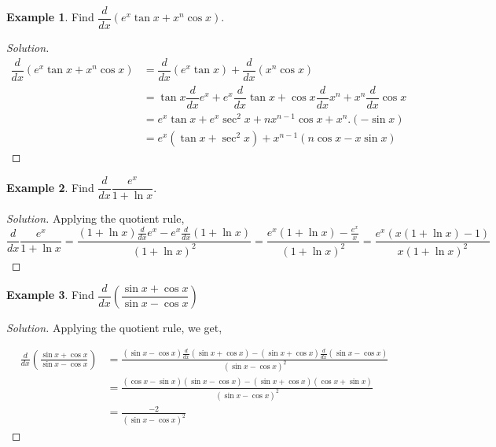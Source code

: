\documentclass[../../main.tex]{subfiles}
\theoremstyle{definition}
\newtheorem{example}{Example}[section]
\newenvironment{solution}
    {\begin{proof}[Solution]}
    {\end{proof}}
\begin{document}
\begin{example}
Find $\dfrac{d}{dx} (e^x \tan x +x^n \cos x)$.    
\end{example}

\begin{solution}
\begin{align*}
\dfrac{d}{dx} (e^x \tan x +x^n \cos x) &= \dfrac{d}{dx} (e^x \tan x) +\dfrac{d}{dx}(x^n \cos x) \\
&= \tan x\dfrac{d}{dx} e^x+e^x \dfrac{d}{dx}\tan x +\cos x\dfrac{d}{dx}x^n+x^n \dfrac{d}{dx}\cos x \\ 
&= e^x \tan x+e^x \sec^2 x +nx^{n-1}\cos x+x^n.(-\sin x) \\
&= e^x(\tan x+\sec^2 x)+x^{n-1}(n\cos x-x\sin x)
\end{align*}    
\end{solution}

\begin{example}
Find $\dfrac{d}{dx} \dfrac{e^x}{1+\ln x}$.    
\end{example}

\begin{solution}
Applying the quotient rule, 
\[
\dfrac{d}{dx} \frac{e^x}{1+\ln x} = \frac{(1+\ln x)\frac{d}{dx}e^x-e^x\frac{d}{dx}(1+\ln x) }{(1+\ln x)^2} = \frac{e^x(1+\ln x)-\frac{e^x}{x}}{(1+\ln x)^2} = \frac{e^x(x(1+\ln x)-1)}{x(1+\ln x)^2}
\]
\end{solution}

\begin{example}
Find $\dfrac{d}{dx}( \dfrac{\sin x+\cos x}{\sin x-\cos x})$    
\end{example}

\begin{solution}
Applying the quotient rule, we get,

\begin{align*}
    \frac{d}{dx} (\frac{\sin x+\cos x}{\sin x-\cos x}) &= \frac{(\sin x - \cos x)\frac{d}{dx}(\sin x+\cos x)-(\sin x+\cos x)\frac{d}{dx}(\sin x-\cos x)}{(\sin x-\cos x)^2} \\
    &= \frac{(\cos x-\sin x)(\sin x-\cos x)-(\sin x+\cos x)(\cos x+\sin x)}{(\sin x-\cos x)^2} \\
    &= \frac{-2}{(\sin x-\cos x)^2}
\end{align*}

\end{solution}
\end{document}
